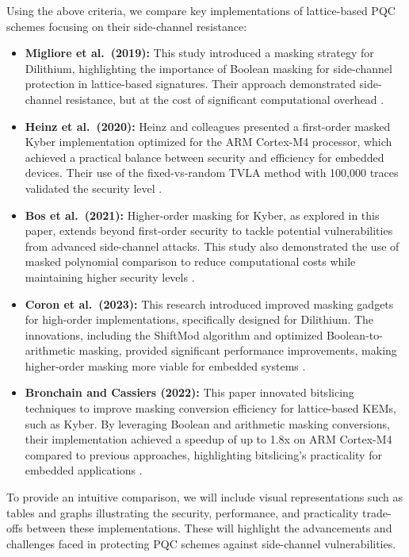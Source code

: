 Using the above criteria, we compare key implementations of lattice-based \ac{PQC} schemes focusing on their side-channel resistance:

\begin{itemize}
    \item \textbf{Migliore et al.\ (2019):} This study introduced a masking strategy for Dilithium, highlighting the importance of Boolean masking for side-channel protection in lattice-based signatures. Their approach demonstrated side-channel resistance, but at the cost of significant computational overhead \cite{Migliore19}.
    \item \textbf{Heinz et al.\ (2020):} Heinz and colleagues presented a first-order masked Kyber implementation optimized for the \ac{ARM} Cortex-M4 processor, which achieved a practical balance between security and efficiency for embedded devices. Their use of the fixed-vs-random \ac{TVLA} method with 100,000 traces validated the security level \cite{Heinz20}.
    \item \textbf{Bos et al.\ (2021):} Higher-order masking for Kyber, as explored in this paper, extends beyond first-order security to tackle potential vulnerabilities from advanced side-channel attacks. This study also demonstrated the use of masked polynomial comparison to reduce computational costs while maintaining higher security levels \cite{Bos21}.
    \item \textbf{Coron et al.\ (2023):} This research introduced improved masking gadgets for high-order implementations, specifically designed for Dilithium. The innovations, including the ShiftMod algorithm and optimized Boolean-to-arithmetic masking, provided significant performance improvements, making higher-order masking more viable for embedded systems \cite{Coron23}.
    \item \textbf{Bronchain and Cassiers (2022):} This paper innovated bitslicing techniques to improve masking conversion efficiency for lattice-based \acp{KEM}, such as Kyber. By leveraging Boolean and arithmetic masking conversions, their implementation achieved a speedup of up to 1.8x on \ac{ARM} Cortex-M4 compared to previous approaches, highlighting bitslicing's practicality for embedded applications \cite{Bronchain22}.
\end{itemize}

To provide an intuitive comparison, we will include visual representations such as tables and graphs illustrating the security, performance, and practicality trade-offs between these implementations. These will highlight the advancements and challenges faced in protecting \ac{PQC} schemes against side-channel vulnerabilities.
